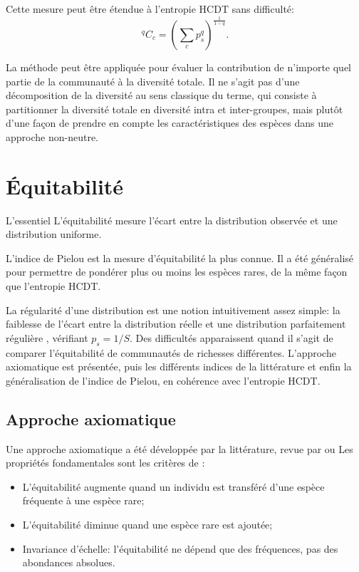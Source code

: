 \documentclass[
  11pt,
  french,
  a4paper,
  extrafontsizes,onecolumn,openright
  ]{memoir}
\providecommand{\tightlist}{%
  \setlength{\itemsep}{0pt}\setlength{\parskip}{0pt}}
\newenvironment{Summary}
  {\begin{bclogo}[logo=\bctrombone, noborder=true, couleur=lightgray!50]{L'essentiel}\parindent0pt}
  {\end{bclogo}}
\newlength{\rf}
\begin{document}
Cette mesure peut être étendue à l'entropie HCDT sans difficulté:
\begin{equation}
  \label{eq:Ccq}
  \mathit{^{q}\!C_{c}} = {\left(\sum_c{p^q_s}\right)}^{\frac{1}{1-q}}.
\end{equation}

La méthode peut être appliquée pour évaluer la contribution de n'importe quel partie de la communauté à la diversité totale.
Il ne s'agit pas d'une décomposition de la diversité au sens classique du terme, qui consiste à partitionner la diversité totale en diversité intra et inter-groupes, mais plutôt d'une façon de prendre en compte les caractéristiques des espèces dans une approche non-neutre.

\chapter{Équitabilité}\label{sec-Equitabilite}

\begin{Summary}
L'équitabilité mesure l'écart entre la distribution observée et une distribution uniforme.

L'indice de Pielou est la mesure d'équitabilité la plus connue. Il a été généralisé pour permettre de pondérer plus ou moins les espèces rares, de la même façon que l'entropie HCDT.

\end{Summary}

La régularité d'une distribution est une notion intuitivement assez simple: la faiblesse de l'écart entre la distribution réelle et une distribution parfaitement régulière \autocite{Lloyd1964}, vérifiant \(p_s={1}/{S}\).
Des difficultés apparaissent quand il s'agit de comparer l'équitabilité de communautés de richesses différentes.
L'approche axiomatique est présentée, puis les différents indices de la littérature et enfin la généralisation de l'indice de Pielou, en cohérence avec l'entropie HCDT.

\section{Approche axiomatique}\label{approche-axiomatique}

Une approche axiomatique a été développée par la littérature, revue par \textcite{Jost2010} ou \textcite{Tuomisto2012} Les propriétés fondamentales sont les critères de \textcite{Dalton1920}:

\begin{itemize}
\tightlist
\item
  L'équitabilité augmente quand un individu est transféré d'une espèce fréquente à une espèce rare;
\item
  L'équitabilité diminue quand une espèce rare est ajoutée;
\item
  Invariance d'échelle: l'équitabilité ne dépend que des fréquences, pas des abondances absolues.
\end{itemize}
\end{document}
